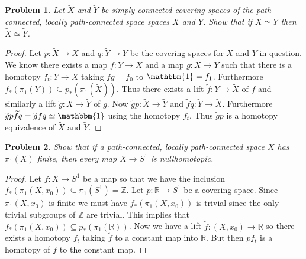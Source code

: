 \documentclass{article}
\newtheorem{problem}{Problem}
\begin{document}
\begin{problem}
Let $\widetilde{X}$ and $\widetilde{Y}$ be simply-connected covering spaces of the path-connected, locally path-connected space spaces $X$ and $Y$. Show that if $X \simeq Y$ then $\widetilde{X} \simeq \widetilde{Y}$.
\end{problem}
\begin{proof}
Let $p : \widetilde{X} \to X$ and $q : \widetilde{Y} \to Y$ be the covering spaces for $X$ and $Y$ in question. We know there exists a map $f : Y \to X$ and a map $g : X \to Y$ such that there is a homotopy $f_t : Y \to X$ taking $fg = f_0$ to $\mathbbm{1} = f_1$. Furthermore $f_*(\pi_1(Y)) \subseteq p_*(\pi_1(\widetilde{X}))$. Thus there exists a lift $\widetilde{f} : Y \to \widetilde{X}$ of $f$ and similarly a lift $\widetilde{g} : X \to \widetilde{Y}$ of $g$. Now $\widetilde{g} p : \widetilde{X} \to \widetilde{Y}$ and $\widetilde{f} q : \widetilde{Y} \to \widetilde{X}$. Furthermore $\widetilde{g} p \widetilde{f} q = \widetilde{g} f q \simeq \mathbbm{1}$ using the homotopy $f_t$. Thus $\widetilde{g} p$ is a homotopy equivalence of $\widetilde{X}$ and $\widetilde{Y}$.
\end{proof}

\begin{problem}
Show that if a path-connected, locally path-connected space $X$ has $\pi_1(X)$ finite, then every map $X \to S^1$ is nullhomotopic.
\end{problem}
\begin{proof}
Let $f : X \to S^1$ be a map so that we have the inclusion $f_*(\pi_1(X,x_0)) \subseteq \pi_1(S^1) = \mathbb{Z}$. Let $p : \mathbb{R} \to S^1$ be a covering space. Since $\pi_1(X,x_0)$ is finite we must have $f_*(\pi_1(X,x_0))$ is trivial since the only trivial subgroups of $\mathbb{Z}$ are trivial. This implies that $f_*(\pi_1(X,x_0)) \subseteq p_*(\pi_1(\mathbb{R}))$. Now we have a lift $\widetilde{f} : (X,x_0) \to \mathbb{R}$ so there exists a homotopy $f_t$ taking $\widetilde{f}$ to a constant map into $\mathbb{R}$. But then $pf_t$ is a homotopy of $f$ to the constant map.
\end{proof}
\end{document}
